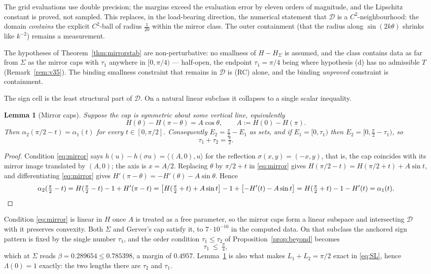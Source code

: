 \documentclass[11pt]{article}
\newtheorem{lemma}[theorem]{Lemma}
\theoremstyle{definition}
\newcommand{\Sig}{\Sigma}
\begin{document}
The grid evaluations use double precision; the margins exceed the evaluation error by
eleven orders of magnitude, and the Lipschitz constant is proved, not sampled. This
replaces, in the load-bearing direction, the numerical statement that $\mathcal D$ is a
$C^2$-neighbourhood: the domain \emph{contains} the explicit $C^2$-ball of radius
$\tfrac1{20}$ within the mirror class. The outer containment (that the radius along
$\sin(2k\theta)$ shrinks like $k^{-2}$) remains a measurement.

The hypotheses of Theorem~\ref{thm:mirrorstab} are non-perturbative: no smallness of
$H-H_\Sig$ is assumed, and the class contains data as far from $\Sig$ as the mirror caps
with $\tau_1$ anywhere in $[0,\pi/4)$ --- half-open, the endpoint $\tau_1=\pi/4$ being where
hypothesis (d) has no admissible $T$ (Remark~\ref{rem:v35}). The binding smallness constraint
that remains in $\mathcal D$ is (RC) alone, and the binding \emph{unproved} constraint is
containment.

The sign cell is the least structural part of $\mathcal D$. On a natural linear
subclass it collapses to a single scalar inequality.

\begin{lemma}[Mirror caps]\label{lem:mirror}
Suppose the cap is symmetric about some vertical line, equivalently
\begin{equation}\label{eq:mirror}
  H(\theta)-H(\pi-\theta)=A\cos\theta,\qquad A:=H(0)-H(\pi) .
\end{equation}
Then $\alpha_2(\pi/2-t)=\alpha_1(t)$ for every $t\in[0,\pi/2]$. Consequently
$E_2=\tfrac\pi2-E_1$ as sets, and if $E_1=[0,\tau_1)$ then $E_2=[0,\tfrac\pi2-\tau_1)$, so
\[
  \tau_1+\tau_2=\tfrac\pi2 .
\]
\end{lemma}

\begin{proof}
Condition \eqref{eq:mirror} says $h(u)-h(\sigma u)=\langle(A,0),u\rangle$ for the reflection
$\sigma(x,y)=(-x,y)$, that is, the cap coincides with its mirror image translated by
$(A,0)$; the axis is $x=A/2$. Replacing $\theta$ by $\pi/2+t$ in \eqref{eq:mirror} gives
$H(\pi/2-t)=H(\pi/2+t)+A\sin t$, and differentiating \eqref{eq:mirror} gives
$H'(\pi-\theta)=-H'(\theta)-A\sin\theta$. Hence
\[
  \alpha_2(\tfrac\pi2-t)=H(\tfrac\pi2-t)-1+H'(\pi-t)
  =\bigl[H(\tfrac\pi2+t)+A\sin t\bigr]-1+\bigl[-H'(t)-A\sin t\bigr]
  =H(\tfrac\pi2+t)-1-H'(t)=\alpha_1(t). \qedhere
\]
\end{proof}

Condition \eqref{eq:mirror} is linear in $H$ once $A$ is treated as a free parameter, so the
mirror caps form a linear subspace and intersecting $\mathcal D$ with it preserves
convexity. Both $\Sig$ and Gerver's cap satisfy it, to $7\cdot10^{-16}$ in the computed
data. On that subclass the anchored sign pattern is fixed by the single number $\tau_1$,
and the order condition $\tau_1\le\tau_2$ of Proposition~\ref{prop:beyond} becomes
\[
  \tau_1\ \le\ \tfrac\pi4 ,
\]
which at $\Sig$ reads $\beta=0.289654\le0.785398$, a margin of $0.4957$. Lemma~\ref{lem:mirror}
is also what makes $L_1+L_2=\pi/2$ exact in \eqref{eq:SL}, hence $\Lambda(0)=1$ exactly:
the two lengths there are $\tau_2$ and $\tau_1$.
\end{document}
